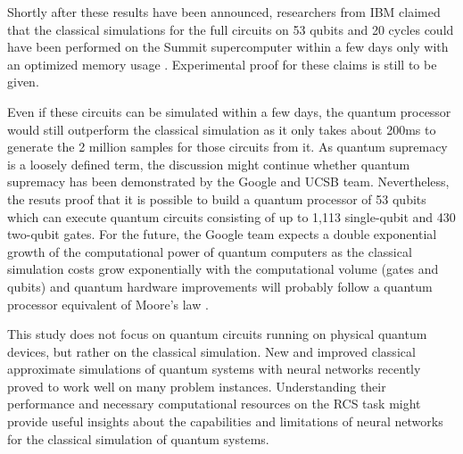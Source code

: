 Shortly after these results have been announced, researchers from IBM claimed that the classical simulations
for the full circuits on 53 qubits and 20 cycles could have been performed
on the Summit supercomputer within a few days only with an optimized memory
usage \cite{pednault2019leveraging}. Experimental proof for these claims is still to be given.

Even if these circuits can be simulated within a few days, the quantum
processor would still outperform the classical simulation as it only
takes about 200ms to generate the 2 million samples for those circuits from it. As quantum
supremacy is a loosely defined term, the discussion might continue whether
quantum supremacy has been demonstrated by the Google and UCSB team. Nevertheless, 
the resuts proof that it is possible to build a quantum processor of 53 qubits
which can execute quantum circuits consisting of up to 1,113 single-qubit and
430 two-qubit gates. For the future, the Google team expects a double exponential growth of the computational
power of quantum computers as the classical simulation costs grow exponentially
with the computational volume (gates and qubits) and quantum hardware
improvements will probably follow a quantum processor equivalent of Moore's law \cite{martines2019supremacy}.

This study does not focus on quantum circuits running on physical quantum devices,
but rather on the classical simulation. New and improved classical
approximate simulations of quantum systems with neural networks recently proved
to work well on many problem instances. 
Understanding their performance and necessary computational resources on
the RCS task might provide useful insights about the capabilities and
limitations of neural networks for the classical simulation of quantum systems.